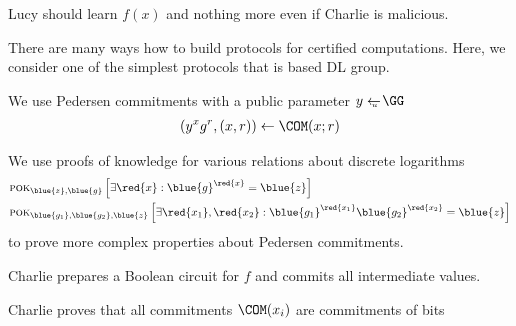 \documentclass[landscape,footrule]{foils}
\begin{document}

\enlargethispage{1cm}

Lucy should learn $f(x)$ and nothing more even if Charlie is malicious.


There are many ways how to build protocols for certified computations.
Here, we consider one of the simplest protocols that is based DL
group.
\begin{triangles}
  \item We use Pedersen commitments with a public parameter $y\getsu\GG$
    \begin{align*}
      (y^xg^r,(x,r))\gets\COM(x;r)
    \end{align*}
  \item We use proofs of knowledge for various relations about discrete logarithms
    \begin{align*}
      &\pok{\blue{z},\blue{g}}{\exists \red{x}: \blue{g}^{\red{x}}=\blue{z}}\\
      &\pok{\blue{g_1},\blue{g_2},\blue{z}}{\exists \red{x_1},\red{x_2}: 
        \blue{g_1}^{\red{x_1}}\blue{g_2}^{\red{x_2}}=\blue{z}}
    \end{align*}
   to prove more complex properties about Pedersen commitments.
\end{triangles}


\enlargethispage{1cm}

Charlie prepares a Boolean circuit for $f$ and commits all intermediate values.



Charlie proves that all commitments $\COM(x_i)$ are commitments of bits
\begin{center}
\end{center}
\bigskip

\end{document}
